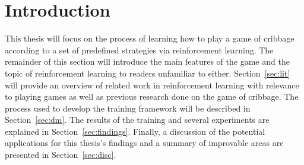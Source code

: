 \section{Introduction}
\label{sec:intro}


This thesis will focus on
the process of learning how to play a game of cribbage
according to a set of predefined strategies
via reinforcement learning.
%
The remainder of this section will introduce the main features
of the game and the topic of reinforcement learning to readers unfamiliar to
either.
%
Section~\ref{sec:lit} will provide an overview of related work in reinforcement
learning with relevance to playing games
as well as previous research done on the game of cribbage.
%
The process used to develop the training framework
will be described in Section~\ref{sec:dm}.
%
The results of the training and several experiments
are explained in Section~\ref{sec:findings}.
%
Finally,
a discussion of the potential applications for this thesis's findings and
a summary of improvable areas are presented in Section~\ref{sec:disc}.






